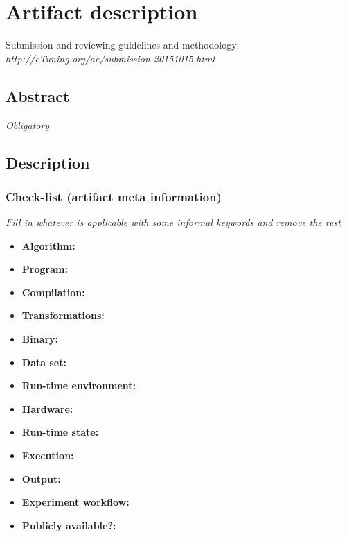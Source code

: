 \documentclass{sigplanconf}
\begin{document}


\appendix
\section{Artifact description}

Submission and reviewing guidelines and methodology: \\
{\em http://cTuning.org/ae/submission-20151015.html}

\subsection{Abstract}

{\em Obligatory}

\subsection{Description}

\subsubsection{Check-list (artifact meta information)}

{\em Fill in whatever is applicable with some informal keywords and remove the rest}

{\small
\begin{itemize}
  \item {\bf Algorithm: }
  \item {\bf Program: }
  \item {\bf Compilation: }
  \item {\bf Transformations: }
  \item {\bf Binary: }
  \item {\bf Data set: }
  \item {\bf Run-time environment: }
  \item {\bf Hardware: }
  \item {\bf Run-time state: }
  \item {\bf Execution: }
  \item {\bf Output: }
  \item {\bf Experiment workflow: }
  \item {\bf Publicly available?: }
\end{itemize}
}
\end{document}
